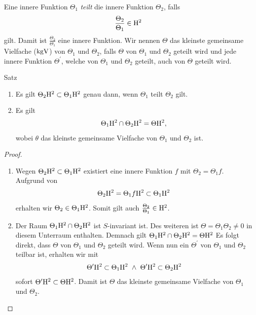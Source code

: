 \begin{df}\label{skript:2.6}
	Eine innere Funktion $ \Theta_1 $ \textit{teilt} die innere Funktion $ \Theta_2 $, falls
	\begin{align*}
	\frac{\Theta_2}{\Theta_1} \in \mathrm{H}^2
		\end{align*}
		gilt. Damit ist $ \frac{\Theta_2}{\Theta_1} $ eine innere Funktion.
		Wir nennen $ \Theta $ das kleinste gemeinsame Vielfache ($ \operatorname{kgV} $) von $ \Theta_1 $ und $ \Theta_2 $, falls $ \Theta $ von $ \Theta_1 $ und $ \Theta_2 $ geteilt wird und jede innere Funktion $ \Theta^\prime $, welche von $ \Theta_1 $ und $ \Theta_2 $ geteilt, auch von $ \Theta $ geteilt wird.
		
\end{df}

\begin{genericthm}{Satz}\label{skript:2.7}
	
	\begin{enumerate}[label=\text{\textbf{(\arabic*)}}]
		\item Es gilt $ \Theta_2 \mathrm{H}^2 \subset \Theta_1 \mathrm{H}^2  $ genau dann, wenn
		$ \Theta_1$ teilt $ \Theta_2 $ gilt.
		
		\item
		Es gilt
		\begin{align*}
		\Theta_1 \mathrm{H}^2 \cap \Theta_2 \mathrm{H}^2 = \Theta \mathrm{H}^2,
		\end{align*}
		wobei $ \theta $ das kleinste gemeinsame Vielfache von $ \Theta_1 $ und $ \Theta_2$ ist.
	\end{enumerate}
	
\end{genericthm}

\begin{proof}
	\begin{enumerate}[label=\text{\textbf{(\arabic*)}}]
		\item
			Wegen $ \Theta_2 \mathrm{H}^2 \subset \Theta_1 \mathrm{H}^2 $ existiert eine innere Funktion $ f $ mit $ \Theta_2 = \Theta_1 f $.\\
			Aufgrund von
			\begin{align*}
			\Theta_2 \mathrm{H}^2 = \Theta_1 f \mathrm{H}^2 \subset \Theta_1 \mathrm{H}^2
			\end{align*}
			erhalten wir $ \Theta_2 \in \Theta_1 \mathrm{H}^2 $. Somit gilt auch 
			$ \frac{\Theta_2}{\Theta_1} \in \mathrm{H}^2 $.
		\item 
			Der Raum $ \Theta_1 \mathrm{H}^2 \cap \Theta_2 \mathrm{H}^2 $ ist $ S $-invariant ist. Des weiteren ist $\Theta= \Theta_1 \Theta_2 \neq 0 $ in diesem Unterraum enthalten.
			Demnach gilt $\Theta_1 \mathrm{H}^2 \cap \Theta_2 \mathrm{H}^2 = \Theta \mathrm{H}^2  $
			Es folgt direkt, dass $ \Theta $ von $ \Theta_1 $ und $ \Theta_2 $ geteilt wird.
			Wenn nun ein $ \Theta^\prime $ von $ \Theta_1$ und $ \Theta_2 $ teilbar ist, erhalten wir mit
			\begin{align*}
			\Theta^\prime \H^2 \subset \Theta_1 \H^2 \ \wedge \ \Theta^\prime \H^2 \subset \Theta_2 \H^2
			\end{align*}
			sofort $ \Theta^\prime \mathrm{H}^2 \subset \Theta \mathrm{H}^2 $.
			Damit ist $ \Theta  $ das kleinste gemeinsame Vielfache von $ \Theta_1 $ und $ \Theta_2 $.
	\end{enumerate}
\end{proof}

 
